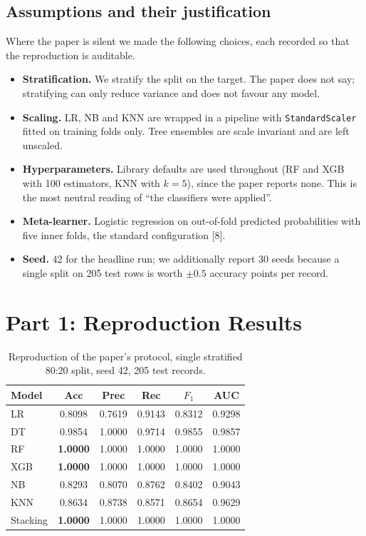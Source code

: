 \documentclass[11pt,a4paper]{article}
\newcommand{\tabhead}[1]{\textbf{#1}}
\newcommand{\best}[1]{\textbf{#1}}
\begin{document}
\subsection{Assumptions and their justification}
Where the paper is silent we made the following choices, each recorded so that
the reproduction is auditable.
\begin{itemize}[leftmargin=*,itemsep=1pt,topsep=2pt]
\item \textbf{Stratification.} We stratify the split on the target. The paper does
      not say; stratifying can only reduce variance and does not favour any model.
\item \textbf{Scaling.} LR, NB and KNN are wrapped in a pipeline with
      \texttt{StandardScaler} fitted on training folds only. Tree ensembles are
      scale invariant and are left unscaled.
\item \textbf{Hyperparameters.} Library defaults are used throughout
      (RF and XGB with 100 estimators, KNN with $k=5$), since the paper reports
      none. This is the most neutral reading of ``the classifiers were applied''.
\item \textbf{Meta-learner.} Logistic regression on out-of-fold predicted
      probabilities with five inner folds, the standard configuration
      [8].
\item \textbf{Seed.} 42 for the headline run; we additionally report 30 seeds
      because a single split on 205 test rows is worth $\pm0.5$ accuracy points
      per record.
\end{itemize}

\section{Part 1: Reproduction Results}\label{sec:repro}

\begin{table}[h]\centering\small
\caption{Reproduction of the paper's protocol, single stratified 80:20 split,
seed 42, 205 test records.}\label{tab:repro}

\begin{tabular}{lccccc}
\toprule
\tabhead{Model} & \tabhead{Acc} & \tabhead{Prec} & \tabhead{Rec} &
\tabhead{$F_1$} & \tabhead{AUC}\\
\midrule
LR       & 0.8098 & 0.7619 & 0.9143 & 0.8312 & 0.9298\\
DT       & 0.9854 & 1.0000 & 0.9714 & 0.9855 & 0.9857\\
RF       & \best{1.0000} & 1.0000 & 1.0000 & 1.0000 & 1.0000\\
XGB      & \best{1.0000} & 1.0000 & 1.0000 & 1.0000 & 1.0000\\
NB       & 0.8293 & 0.8070 & 0.8762 & 0.8402 & 0.9043\\
KNN      & 0.8634 & 0.8738 & 0.8571 & 0.8654 & 0.9629\\
Stacking & \best{1.0000} & 1.0000 & 1.0000 & 1.0000 & 1.0000\\
\bottomrule
\end{tabular}
\end{table}
\end{document}
